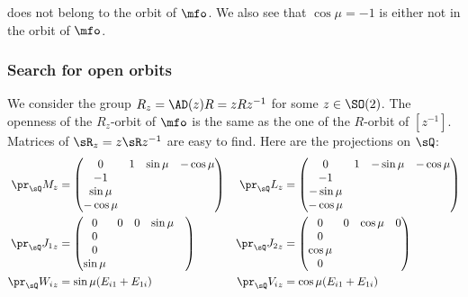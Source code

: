 does not belong to the orbit of $\mfo$. We also see that $\cos \mu=-1$ is either not in the orbit of $\mfo$.

\subsubsection{Search for open orbits}

We consider the group $R_z=\AD(z)R=zRz^{-1}$ for some $z\in \SO(2)$. The openness of the $R_z$-orbit of $\mfo$ is the same as the one of the $R$-orbit of $[z^{-1}]$. Matrices of $\sR_z=z\sR z^{-1}$ are easy to find. Here are the projections on $\sQ$:
\begin{subequations}
	\begin{align}
		\pr_{\sQ} M_z     & =
		\begin{pmatrix}
			0 & 1 & \sin\mu & -\cos\mu \\
			-1                         \\
			\sin\mu                    \\
			-\cos\mu
		\end{pmatrix}
		                  & \pr_{\sQ} L_z           & =
		\begin{pmatrix}
			0 & 1 & -\sin\mu & -\cos\mu \\
			-1                          \\-\sin\mu\\
			-\cos\mu
		\end{pmatrix}                                                     \\
		\pr_{\sQ} {J_1}_z & =
		\begin{pmatrix}
			0 & 0 & 0 & \sin\mu & \\
			0                     \\
			0                     \\
			\sin\mu
		\end{pmatrix}
		                  & \pr_{\sQ} {J_2}_z       & =
		\begin{pmatrix}
			0 & 0 & \cos\mu & 0 \\
			0                   \\
			\cos\mu             \\
			0
		\end{pmatrix}                                                                       \\
		\pr_{\sQ} {W_i}_z & =\sin\mu(E_{i1}+E_{1i}) & \pr_{\sQ} {V_i}_z & =\cos\mu(E_{i1}+E_{1i})
	\end{align}
\end{subequations}
